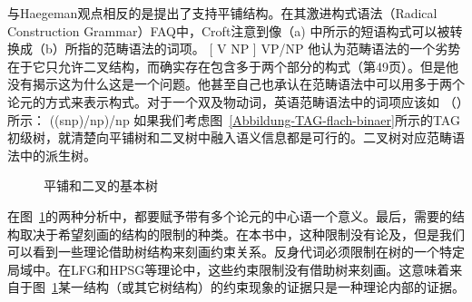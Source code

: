 与Haegeman观点相反的是\citeyearpar[\S~1.6.2]{Croft2001a}提出了支持平铺结构。在其\indexcxgc 激进构式语法（Radical Construction Grammar）FAQ中，Croft注意到像（a) 中所示的短语构式可以被转换成（b）所指的范畴语法的词项\indexcgc。
\eal
\ex {}[ V NP ]
\ex VP/NP
\zl
他认为范畴语法的一个劣势在于它只允许二叉结构，而确实存在包含多于两个部分的构式（第49页）。但是他没有揭示这为什么这是一个问题。他甚至自己也承认在范畴语法中可以用多于两个论元的方式来表示构式。对于一个双及物动词，英语范畴语法中的词项应该如 （）所示：
\ea
((s\bs np)/np)/np
\z
如果我们考虑图~\vref{Abbildung-TAG-flach-binaer}所示的TAG初级树，就清楚向平铺树和二叉树中融入语义信息都是可行的。二叉树对应范畴语法中的派生树。
\begin{figure}
\hfill
{}
\hfill
{}
\hfill\mbox{}
\caption{\label{Abbildung-TAG-flach-binaer}平铺和二叉的基本树}
\end{figure}%
在图~\ref{Abbildung-TAG-flach-binaer}的两种分析中，都要赋予带有多个论元的中心语一个意义。最后，需要的结构取决于希望刻画的结构的限制的种类。在本书中，这种限制没有论及，但是我们可以看到一些理论借助树结构来刻画约束关系。反身代词必须限制在树的一个特定局域中。在LFG\indexlfgc 和HPSG\indexhpsgc 等理论中，这些约束限制没有借助树来刻画。这意味着来自于图~\ref{Abbildung-TAG-flach-binaer}某一结构（或其它树结构）的约束现象的证据只是一种理论内部的证据。
